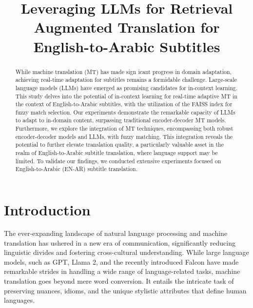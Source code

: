 \documentclass{article}
\title{Leveraging LLMs for Retrieval Augmented Translation for English-to-Arabic Subtitles}
\begin{document}
	

\maketitle

\begin{abstract}
While machine translation (MT) has made sign
icant progress in domain adaptation, achieving real-time adaptation for subtitles remains a formidable challenge. Large-scale language models (LLMs) have emerged as promising candidates for in-context learning. This study delves into the potential of in-context learning for real-time adaptive MT in the context of English-to-Arabic subtitles, with the utilization of the FAISS index for fuzzy match selection. Our experiments demonstrate the remarkable capacity of LLMs to adapt to in-domain content, surpassing traditional encoder-decoder MT models. Furthermore, we explore the integration of MT techniques, encompassing both robust encoder-decoder models and LLMs, with fuzzy matching. This integration reveals the potential to further elevate translation quality, a particularly valuable asset in the realm of English-to-Arabic subtitle translation, where language support may be limited. To validate our findings, we conducted extensive experiments focused on English-to-Arabic (EN-AR) subtitle translation.
	
\end{abstract}
%
\section{Introduction}\label{sec:introduction}

The ever-expanding landscape of natural language processing and machine translation has ushered in a new era of communication, significantly reducing linguistic divides and fostering cross-cultural understanding. While large language models, such as GPT, Llama 2, and the recently introduced Falcon have made remarkable strides in handling a wide range of language-related tasks, machine translation goes beyond mere word conversion. It entails the intricate task of preserving nuances, idioms, and the unique stylistic attributes that define human languages.
\end{document}
